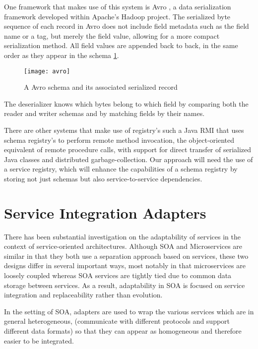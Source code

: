 One framework that makes use of this system is Avro \cite{8}, a data serialization framework developed within Apache's Hadoop project.
The serialized byte sequence of each record in Avro does not include field metadata such as the field name or a tag, but merely the field value, allowing for a more compact serialization method.
All field values are appended back to back, in the same order as they appear in the schema \ref{fig:avro}.

\begin{figure}[htbp]
    \centering
    \texttt{[image: avro]}
    \caption{A Avro schema and its associated serialized record }
    \label{fig:avro}
\end{figure}

The deserializer knows which bytes belong to which field by comparing both the reader and writer schemas and by matching fields by their names.

There are other systems that make use of registry's such a Java RMI \cite{12} that uses schema registry's
to perform remote method invocation, the object-oriented equivalent of remote procedure calls, with support for direct
transfer of serialized Java classes and distributed garbage-collection.
Our approach will need the use of a service registry, which will enhance the capabilities of a schema registry by storing not just schemas but also service-to-service dependencies.

\section{Service Integration Adapters} %
\label{sec:service_integration_adapters}

There has been substantial investigation on the adaptability of services in the context of service-oriented architectures.
Although SOA \cite{7} and Microservices \cite{14} are similar in that they both use a separation approach based on services,
these two designs differ in several important ways, most notably in that microservices are loosely coupled whereas SOA services are tightly tied due to common data storage between services.
As a result, adaptability in SOA is focused on service integration and replaceability rather than evolution.

In the setting of SOA, adapters are used to wrap the various services which are in general heterogeneous,
(communicate with different protocols and support different data formats) so that they can appear as homogeneous and therefore easier to be integrated.

